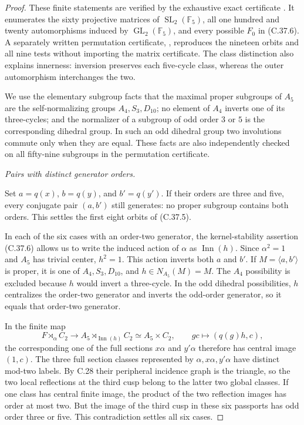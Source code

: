 \begin{proof}
These finite statements are verified by the exhaustive exact
certificate .
It enumerates the sixty projective matrices of
\(\operatorname{SL}_2(\mathbb F_5)\), all one hundred and
twenty automorphisms induced by \(\operatorname{GL}_2(\mathbb F_5)\),
and every possible \(F_0\) in (C.37.6). A separately written
permutation certificate, ,
reproduces the nineteen orbits and all nine tests without importing
the matrix certificate. The class distinction also explains
innerness: inversion preserves each five-cycle class, whereas
the outer automorphism interchanges the two.

We use the elementary subgroup facts that the maximal proper
subgroups of \(A_5\) are the self-normalizing groups
\(A_4,S_3,D_{10}\); no element of \(A_4\) inverts one
of its three-cycles; and the normalizer of a subgroup of odd
order \(3\) or \(5\) is the corresponding dihedral
group. In such an odd dihedral group two involutions commute
only when they are equal. These facts are also independently
checked on all fifty-nine subgroups in the permutation certificate.

\emph{Pairs with distinct generator orders.}\par
Set \(a=q(x)\), \(b=q(y)\), and \(b'=q(y')\).
If their orders are three and five, every conjugate pair
\((a,b')\) still generates: no proper subgroup contains
both orders. This settles the first eight orbits of (C.37.5).

In each of the six cases with an order-two generator, the
kernel-stability assertion (C.37.6) allows us to write the
induced action of \(\alpha\) as \(\operatorname{Inn}(h)\).
Since \(\alpha^2=1\) and \(A_5\) has trivial center,
\(h^2=1\). This action inverts both \(a\) and \(b'\).
If \(M=\langle a,b'\rangle\) is proper, it is one of
\(A_4,S_3,D_{10}\), and \(h\in N_{A_5}(M)=M\).
The \(A_4\) possibility is excluded because \(h\) would
invert a three-cycle. In the odd dihedral possibilities,
\(h\) centralizes the order-two generator and inverts the
odd-order generator, so it equals that order-two generator.

In the finite map
\[
 F\rtimes_\alpha C_2\longrightarrow
 A_5\rtimes_{\operatorname{Inn}(h)}C_2
              \simeq A_5\times C_2,
 \qquad gc\longmapsto(q(g)h,c),
\]
the corresponding one of the full sections \(x\alpha\)
and \(y'\alpha\) therefore has central image \((1,c)\).
The three full section classes represented by
\(\alpha,x\alpha,y'\alpha\) have distinct mod-two
labels. By C.28 their peripheral incidence graph is the
triangle, so the two local reflections at the third cusp
belong to the latter two global classes. If one class has
central finite image, the product of the two reflection
images has order at most two. But the image of the third
cusp in these six passports has odd order three or five.
This contradiction settles all six cases.


\end{proof}
